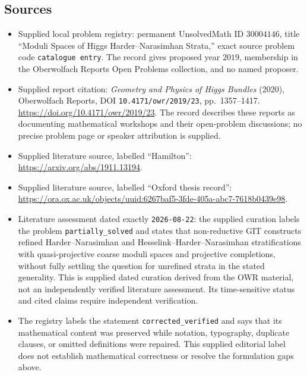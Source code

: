 \documentclass[11pt]{article}
\begin{document}
\subsection{Sources}
\begin{itemize}
\item Supplied local problem registry: permanent UnsolvedMath ID \(30004146\), title ``Moduli Spaces of Higgs Harder--Narasimhan Strata,'' exact source problem code \texttt{catalogue entry}. The record gives proposed year \(2019\), membership in the Oberwolfach Reports Open Problems collection, and no named proposer.
\item Supplied report citation: \emph{Geometry and Physics of Higgs Bundles} (2020), Oberwolfach Reports, DOI \texttt{10.4171/owr/2019/23}, pp.\ 1357--1417. \url{https://doi.org/10.4171/owr/2019/23}. The record describes these reports as documenting mathematical workshops and their open-problem discussions; no precise problem page or speaker attribution is supplied.
\item Supplied literature source, labelled ``Hamilton'': \url{https://arxiv.org/abs/1911.13194}.
\item Supplied literature source, labelled ``Oxford thesis record'': \url{https://ora.ox.ac.uk/objects/uuid:6267baf5-3fde-405a-abc7-7618b0439e98}.
\item Literature assessment dated exactly \texttt{2026-08-22}: the supplied curation labels the problem \texttt{partially\_solved} and states that non-reductive GIT constructs refined Harder--Narasimhan and Hesselink--Harder--Narasimhan stratifications with quasi-projective coarse moduli spaces and projective completions, without fully settling the question for unrefined strata in the stated generality. This is supplied dated curation derived from the OWR material, not an independently verified literature assessment. Its time-sensitive status and cited claims require independent verification.
\item The registry labels the statement \texttt{corrected\_verified} and says that its mathematical content was preserved while notation, typography, duplicate clauses, or omitted definitions were repaired. This supplied editorial label does not establish mathematical correctness or resolve the formulation gaps above.
\end{itemize}
\end{document}
